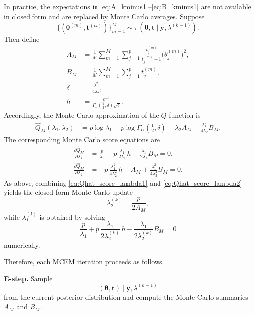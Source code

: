 \documentclass[preprint,12pt,authoryear]{elsarticle}
\def\bs{\boldsymbol}
\def\th{\boldsymbol{\theta}}
\begin{document}
In practice, the expectations in \eqref{eq:A_kminus1}--\eqref{eq:B_kminus1}
are not available in closed form and are replaced by Monte Carlo averages.
Suppose
\[
\bigl\{(\th^{(m)},\bs t^{(m)})\bigr\}_{m=1}^M
\sim
\pi(\th,\bs t\mid \bs y,\lambda^{(k-1)}).
\]
Then define
\begin{align}
A_M
&=
\frac{1}{M}\sum_{m=1}^M
\sum_{j=1}^p
\frac{t_j^{(m)}}{t_j^{(m)}-1}\bigl(\theta_j^{(m)}\bigr)^2,
\\
B_M
&=
\frac{1}{M}\sum_{m=1}^M
\sum_{j=1}^p t_j^{(m)},
\\
\delta
&=
\frac{\lambda_1^2}{4\lambda_2},
\\
h
&=
\frac{e^{-\delta}}
{\Gamma_U\!\left(\frac12,\delta\right)\sqrt{\delta}}.
\end{align}
Accordingly, the Monte Carlo approximation of the \(Q\)-function is
\begin{align}
\widehat Q_M(\lambda_1,\lambda_2)
&=
p\log\lambda_1
-p\log \Gamma_U\!\left(\frac12,\delta\right)
-\lambda_2 A_M
-\frac{\lambda_1^2}{4\lambda_2}B_M.
\label{eq:Qhat_clean}
\end{align}
The corresponding Monte Carlo score equations are
\begin{align}
\frac{\partial \widehat Q_M}{\partial \lambda_1}
&=
\frac{p}{\lambda_1}
+p\,\frac{\lambda_1}{2\lambda_2}\,h
-\frac{\lambda_1}{2\lambda_2}B_M
=0,
\label{eq:Qhat_score_lambda1}
\\[1mm]
\frac{\partial \widehat Q_M}{\partial \lambda_2}
&=
-p\,\frac{\lambda_1^2}{4\lambda_2^2}\,h
-A_M
+\frac{\lambda_1^2}{4\lambda_2^2}B_M
=0.
\label{eq:Qhat_score_lambda2}
\end{align}
As above, combining \eqref{eq:Qhat_score_lambda1} and
\eqref{eq:Qhat_score_lambda2} yields the closed-form Monte Carlo update
\begin{equation}
\lambda_2^{(k)}
=
\frac{p}{2A_M},
\label{eq:lambda2_MC_update_clean}
\end{equation}
while \(\lambda_1^{(k)}\) is obtained by solving
\begin{equation}
\frac{p}{\lambda_1}
+p\,\frac{\lambda_1}{2\lambda_2^{(k)}}\,h
-\frac{\lambda_1}{2\lambda_2^{(k)}}B_M
=0
\label{eq:lambda1_MC_equation_clean}
\end{equation}
numerically.


Therefore, each MCEM iteration proceeds as follows.


\medskip
\noindent
\textbf{E-step.}
Sample
\[
(\th,\bs t)\mid \bs y,\lambda^{(k-1)}
\]
from the current posterior distribution and compute the Monte Carlo summaries
\(A_M\) and \(B_M\).
\end{document}
